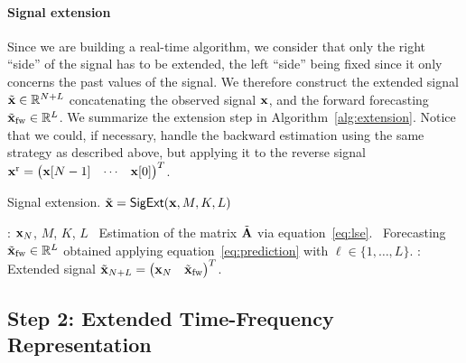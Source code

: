 \paragraph{Signal extension} Since we are building a real-time algorithm, we consider that only the right ``side'' of the signal has to be extended, the left ``side'' being fixed since it only concerns the past values of the signal. We therefore construct the extended signal $\tilde{{\mathbf x}}\in{\mathbb R}^{N+L}$ concatenating the observed signal ${\mathbf x}$, and the forward forecasting $\tilde{{\mathbf x}}_{\mathrm{fw}}\in{\mathbb R}^L$. We summarize the extension step in Algorithm~\ref{alg:extension}. Notice that we could, if necessary, handle the backward estimation using the same strategy as described above, but applying it to the reverse signal ${\mathbf x}^{\rm r} = \begin{pmatrix} {\mathbf x}[N-1] & \cdots & {\mathbf x}[0] \end{pmatrix}^T$.

\begin{algorithm}
\caption{Signal extension. $\tilde{{\mathbf x}} = \relax{\sf SigExt}({\mathbf x},M,K,L)$}
\label{alg:extension}
\begin{algorithmic}
: ${\mathbf x}_N$, $M$, $K$, $L$
\STATE \vspace{-2mm}
\STATE \quad\textbullet\ Estimation of the matrix $\tilde{{\mathbf A}}$ via equation~\eqref{eq:lse}.
\STATE \quad\textbullet\ Forecasting $\tilde{{\mathbf x}}_{\mathrm{fw}}\in{\mathbb R}^L$ obtained applying equation~\eqref{eq:prediction} with $\ell\in\{1,\ldots,L\}$.
\STATE \vspace{-2mm}
: Extended signal $\tilde{{\mathbf x}}_{N+L} = \begin{pmatrix} {\mathbf x}_N & \tilde{{\mathbf x}}_{\mathrm{fw}}\end{pmatrix}^T$. %
\end{algorithmic}
\end{algorithm}

\subsection{Step 2: Extended Time-Frequency Representation}
 
